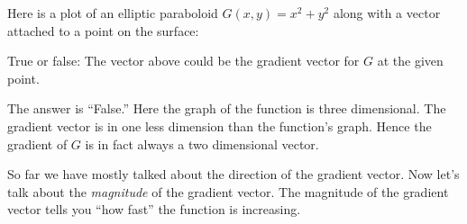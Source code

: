 \documentclass{ximera}
\begin{document}
\begin{question}
  Here is a plot of an elliptic paraboloid $G(x,y) = x^2 + y^2$ along
  with a vector attached to a point on the surface:
  \begin{image}
  \end{image}
  True or false: The vector above could be the gradient vector for $G$
  at the given point.
  \begin{prompt}
  \begin{multipleChoice}
  \end{multipleChoice}
  \begin{feedback}
    The answer is ``False.'' Here the graph of the function is three
    dimensional. The gradient vector is in one less dimension than the
    function's graph. Hence the gradient of $G$ is in fact always a
    two dimensional vector.
  \end{feedback}
  \end{prompt}
\end{question}

So far we have mostly talked about the direction of the gradient
vector. Now let's talk about the \textit{magnitude} of the gradient
vector. The magnitude of the gradient vector tells you ``how fast''
the function is increasing.
\end{document}
